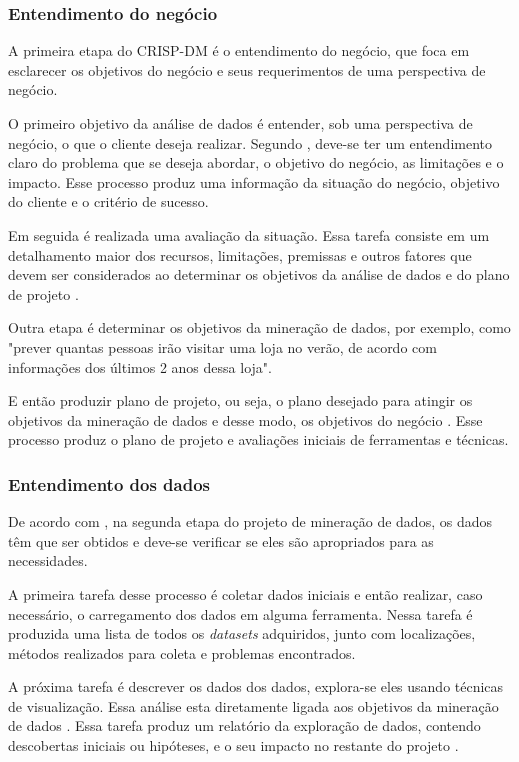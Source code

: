 \subsubsection{Entendimento do negócio}
A primeira etapa do CRISP-DM é o entendimento do negócio, que foca em esclarecer os objetivos do negócio e seus requerimentos de uma perspectiva de negócio.

O primeiro objetivo da análise de dados é entender, sob uma perspectiva de negócio, o que o cliente deseja realizar. Segundo , deve-se ter um entendimento claro do problema que se deseja abordar, o objetivo do negócio, as limitações e o impacto. Esse processo produz uma informação da situação do negócio, objetivo do cliente e o critério de sucesso.

Em seguida é realizada uma avaliação da situação. Essa tarefa consiste em um detalhamento maior dos recursos, limitações, premissas e outros fatores que devem ser considerados ao determinar os objetivos da análise de dados e do plano de projeto \citep{crispmanual}.

Outra etapa é determinar os objetivos da mineração de dados, por exemplo, como "prever quantas pessoas irão visitar uma loja no verão, de acordo com informações dos últimos 2 anos dessa loja".

E então produzir plano de projeto, ou seja, o plano desejado para atingir os objetivos da mineração de dados e desse modo, os objetivos do negócio \citep{crispmanual}. Esse processo produz o plano de projeto e avaliações iniciais de ferramentas e técnicas.

\subsubsection{Entendimento dos dados}
De acordo com , na segunda etapa do projeto de mineração de dados, os dados têm que ser obtidos e deve-se verificar se eles são apropriados para as necessidades.

A primeira tarefa desse processo é coletar dados iniciais e então realizar, caso necessário, o carregamento dos dados em alguma ferramenta. Nessa tarefa é produzida uma lista de todos os \textit{datasets} adquiridos, junto com localizações, métodos realizados para coleta e problemas encontrados.

A próxima tarefa é descrever os dados dos dados, explora-se eles usando técnicas de visualização. Essa análise esta diretamente ligada aos objetivos da mineração de dados \citep{crispmanual}. Essa tarefa produz um relatório da exploração de dados, contendo descobertas iniciais ou hipóteses, e o seu impacto no restante do projeto \citep{crispmanual}.

